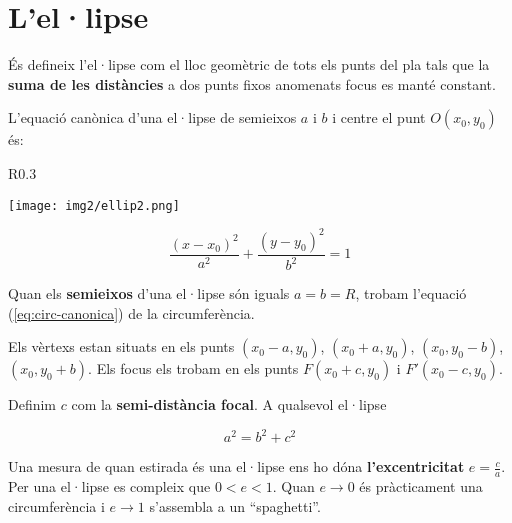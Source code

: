 \documentclass[11pt, a4paper, pdf]{article}
\begin{document}
\section{L'el·lipse}
\begin{theorybox}
	
	És defineix l'el·lipse com el lloc geomètric de tots els punts del pla
	tals que la \textbf{suma de les distàncies} a dos punts fixos anomenats focus es manté constant.
	
	L'equació canònica d'una el·lipse de semieixos $a$ i $b$ i centre el punt $O(x_0, y_0)$ és:
	\begin{wrapfigure}{R}{0.3\textwidth} 
		\vspace{-1cm}
		\begin{center}
			\texttt{[image: img2/ellip2.png]}
		\end{center}
		\vspace{-1cm}
	\end{wrapfigure}
	\begin{equation}
	\label{eq:ellipse-canonica}
	\frac{(x-x_0)^2}{a^2}+\frac{(y-y_0)^2}{b^2}=1
	\end{equation}
	
	
	Quan els \textbf{semieixos} d'una el·lipse són iguals $a=b=R$, trobam l'equació (\ref{eq:circ-canonica}) de la circumferència.
	
	Els vèrtexs estan situats en els punts $(x_0-a, y_0)$, $(x_0+a, y_0)$, $(x_0, y_0-b)$, $(x_0, y_0+b)$. Els focus els trobam en els punts $F(x_0+c, y_0)$ i $F'(x_0-c,y_0)$.
	
	Definim $c$ com la \textbf{semi-distància focal}. A qualsevol el·lipse 
	
	\[ \boxed{a^2=b^2+c^2} \]
	
	Una mesura de quan estirada és una el·lipse ens ho dóna \textbf{l'excentricitat} $\boxed{e=\frac{c}{a}}$. Per una el·lipse es compleix que $0<e<1$. Quan $e \rightarrow 0$ és pràcticament una circumferència i $e \rightarrow 1$ s'assembla a un ``spaghetti''. 
	
\end{theorybox}
\end{document}
